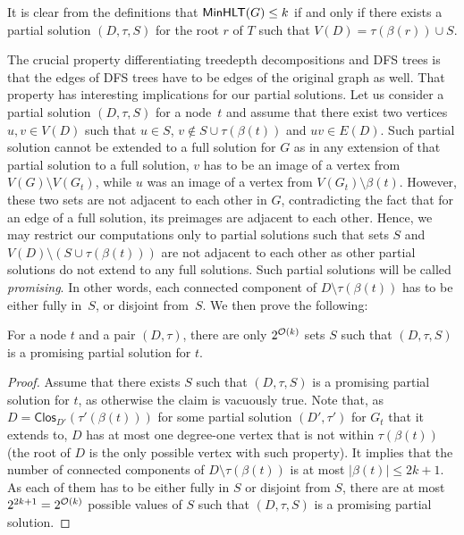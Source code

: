 \documentclass[a4paper,11pt]{article}
\begin{document}
It is clear from the definitions that $\mathsf{MinHLT}(G) \le k$ if and only if there exists a partial solution $(D, \tau, S)$ for the root $r$ of $T$ such that $V(D) = \tau(\beta(r)) \cup S$.

The crucial property differentiating treedepth decompositions and DFS trees is that the edges of DFS trees have to be edges of the original graph as well. That property has interesting implications for our partial solutions. Let us consider a partial solution $(D, \tau, S)$ for a node~$t$ and assume that there exist 
two vertices $u, v \in V(D)$
such that $u \in S$, $v \notin S \cup \tau(\beta(t))$ and $uv \in E(D)$. Such partial solution cannot be extended to a full solution for $G$ as in any extension of that partial solution to a full solution, $v$ has to be an image of a vertex from $V(G) \setminus V(G_t)$, while $u$ was an image of a vertex from $V(G_t) \setminus \beta(t)$. However, these two sets are not adjacent to each other in $G$, contradicting the fact that for an edge of a full solution, its preimages are adjacent to each other. Hence, we may restrict our computations only to partial solutions such that sets $S$ and $V(D) \setminus (S \cup \tau(\beta(t)))$ are not adjacent to each other as other partial solutions do not extend to any full solutions. Such partial solutions will be called \emph{promising}. In other words, each connected component of $D \setminus \tau(\beta(t))$ has to be either fully in~$S$, or disjoint from~$S$. We then prove the following:

\begin{lemma}\label{lem:promising-sets}
For a node $t$ and a pair $(D, \tau)$, there are only $2^{{\mathcal{O}}(k)}$ sets $S$ such that $(D, \tau, S)$ is a promising partial solution for $t$.
\end{lemma}
\begin{proof}
Assume that there exists $S$ such that $(D, \tau, S)$ is a promising partial solution for $t$, as otherwise the claim is vacuously true. Note that, as $D = \mathsf{Clos}_{D'}(\tau'(\beta(t)))$ for some partial solution $(D', \tau')$ for $G_t$ that it extends to, $D$ has at most one degree-one vertex that is not within $\tau(\beta(t))$ (the root of $D$ is the only possible vertex with such property). It implies that the number of connected components of $D \setminus \tau(\beta(t))$ is at most $|\beta(t)| \le 2k+1$. As each of them has to be either fully in $S$ or disjoint from $S$, there are at most $2^{2k+1} = 2^{{\mathcal{O}}(k)}$ possible values of $S$ such that $(D, \tau, S)$ is a promising partial solution.
\end{proof}
\end{document}
